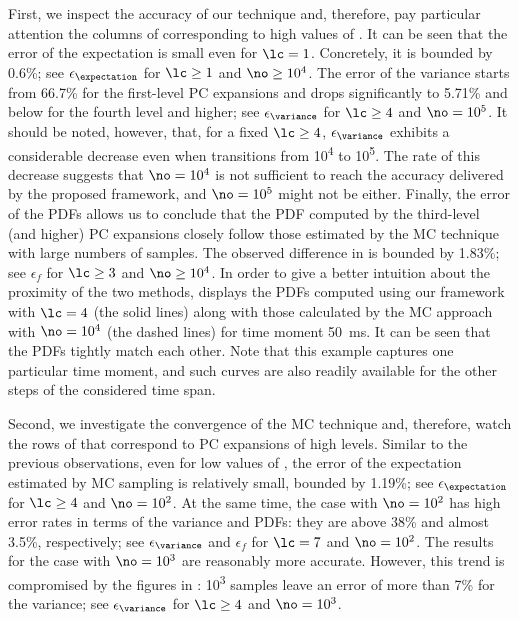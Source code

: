 First, we inspect the accuracy of our technique and, therefore, pay particular
attention the columns of  corresponding to high values
of \no. It can be seen that the error of the expectation is small even for $\lc
= 1$. Concretely, it is bounded by 0.6\%; see $\epsilon_{\expectation}$ for
$\lc \geq 1$ and $\no \geq 10^4$. The error of the variance starts from 66.7\%
for the first-level \ac{PC} expansions and drops significantly to 5.71\% and
below for the fourth level and higher; see $\epsilon_{\variance}$ for $\lc \geq
4$ and $\no = 10^5$. It should be noted, however, that, for a fixed $\lc \geq
4$, $\epsilon_{\variance}$ exhibits a considerable decrease even when \no
transitions from 10\textsuperscript{4} to 10\textsuperscript{5}. The rate of
this decrease suggests that $\no = 10^4$ is not sufficient to reach the accuracy
delivered by the proposed framework, and $\no = 10^5$ might not be either.
Finally, the error of the \acp{PDF} allows us to conclude that the \ac{PDF}
computed by the third-level (and higher) \ac{PC} expansions closely follow those
estimated by the \ac{MC} technique with large numbers of samples. The observed
difference in  is bounded by 1.83\%; see $\epsilon_f$
for $\lc \geq 3$ and $\no \geq 10^4$. In order to give a better intuition about
the proximity of the two methods,  displays the
\acp{PDF} computed using our framework with $\lc = 4$ (the solid lines) along
with those calculated by the \ac{MC} approach with $\no = 10^4$ (the dashed
lines) for time moment 50~ms. It can be seen that the \acp{PDF} tightly match
each other. Note that this example captures one particular time moment, and such
curves are also readily available for the other steps of the considered time
span.

Second, we investigate the convergence of the \ac{MC} technique and, therefore,
watch the rows of  that correspond to \ac{PC}
expansions of high levels. Similar to the previous observations, even for low
values of \no, the error of the expectation estimated by \ac{MC} sampling is
relatively small, bounded by 1.19\%; see $\epsilon_{\expectation}$ for $\lc
\geq 4$ and $\no = 10^2$. At the same time, the case with $\no = 10^2$ has high
error rates in terms of the variance and \acp{PDF}: they are above 38\% and
almost 3.5\%, respectively; see $\epsilon_{\variance}$ and $\epsilon_f$ for
$\lc = 7$ and $\no = 10^2$. The results for the case with $\no = 10^3$ are
reasonably more accurate. However, this trend is compromised by the figures in
: 10\textsuperscript{3} samples leave an error of more
than 7\% for the variance; see $\epsilon_{\variance}$ for $\lc \geq 4$ and $\no
= 10^3$.

